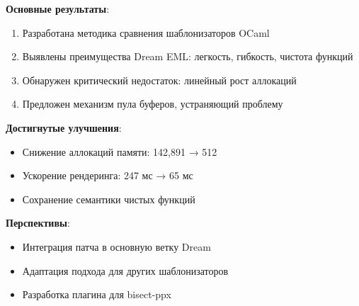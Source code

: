 \textbf{Основные результаты}:
\begin{enumerate}
    \item Разработана методика сравнения шаблонизаторов OCaml
    \item Выявлены преимущества Dream EML: легкость, гибкость, чистота функций
    \item Обнаружен критический недостаток: линейный рост аллокаций
    \item Предложен механизм пула буферов, устраняющий проблему
\end{enumerate}

\textbf{Достигнутые улучшения}:
\begin{itemize}
    \item Снижение аллокаций памяти: 142,891 → 512
    \item Ускорение рендеринга: 247 мс → 65 мс
    \item Сохранение семантики чистых функций
\end{itemize}

\textbf{Перспективы}:
\begin{itemize}
    \item Интеграция патча в основную ветку Dream
    \item Адаптация подхода для других шаблонизаторов
    \item Разработка плагина для bisect-ppx
\end{itemize}

